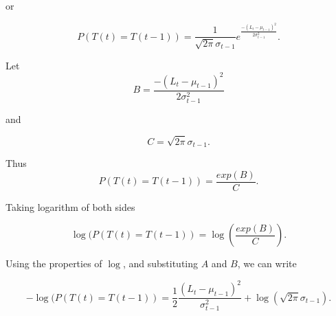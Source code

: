 \documentclass[lettersize,journal]{IEEEtran}
\begin{document}
 or 
 
 \begin{equation} 
 P(T(t) = T(t - 1)) = \frac{1}{\sqrt{2\pi}\sigma_{t-1}}e^{\frac{-(L_t - \mu_{t-1})^2}{2\sigma_{t-1}^2}}.
 \end{equation}
 
 Let 
 \begin{equation}
     B = \frac{-(L_t - \mu_{t-1})^2}{2\sigma_{t-1}^2}
 \end{equation}
 
 \noindent and 
 
 \begin{equation}
     C = \sqrt{2\pi}\sigma_{t-1}.
 \end{equation}
 
 \noindent Thus 
 \begin{equation} 
    P(T(t) = T(t-1)) = \frac{exp(B)}{C}.
\end{equation}

\noindent Taking logarithm of both sides 

\begin{equation}
    \log(P(T(t) = T(t - 1)) = \log\left(\frac{exp(B)}{C}\right).
\end{equation}

\noindent Using the properties of $\log$, and substituting $A$ and $B$, we can write  
\begin{comment}
\begin{equation}
    -\log(P(T(t) = T(t - 1)) = -B + \log(C).  
\end{equation}

\noindent Substituting $A$ and $B$, we get 
\end{comment}
\begin{equation}
    -\log(P(T(t) = T(t - 1)) = \frac{1}{2}\frac{(L_t - \mu_{t-1})^2}{\sigma_{t-1}^2} + \log(\sqrt{2\pi}\sigma_{t-1}). 
\end{equation}


 
 
\end{document}
